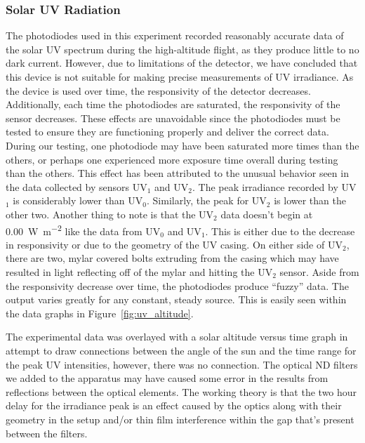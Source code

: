 





\subsubsection{Solar UV Radiation}

The photodiodes used in this experiment recorded reasonably accurate data of the solar UV spectrum during the high-altitude flight, as they produce little to no dark current. However, due to limitations of the detector, we have concluded that this device is not suitable for making precise measurements of UV irradiance. As the device is used over time, the responsivity of the detector decreases. Additionally, each time the photodiodes are saturated, the responsivity of the sensor decreases. These effects are unavoidable since the photodiodes must be tested to ensure they are functioning properly and deliver the correct data. During our testing, one photodiode may have been saturated more times than the others, or perhaps one experienced more exposure time overall during testing than the others. This effect has been attributed to the unusual behavior seen in the data collected by sensors UV$_1$ and UV$_2$. The peak irradiance recorded by UV$_1$ is considerably lower than UV$_0$. Similarly, the peak for UV$_2$ is lower than the other two. Another thing to note is that the UV$_2$ data doesn't begin at \SI{0.00}{\watt\per\meter\squared} like the data from UV$_0$ and UV$_1$. This is either due to the decrease in responsivity or due to the geometry of the UV casing. On either side of UV$_2$, there are two, mylar covered bolts extruding from the casing which may have resulted in light reflecting off of the mylar and hitting the UV$_2$ sensor. Aside from the responsivity decrease over time, the photodiodes produce ``fuzzy'' data. The output varies greatly for any constant, steady source. This is easily seen within the data graphs in Figure~\ref{fig:uv_altitude}.

The experimental data was overlayed with a solar altitude versus time graph in attempt to draw connections between the angle of the sun and the time range for the peak UV intensities, however, there was no connection. The optical ND filters we added to the apparatus may have caused some error in the results from reflections between the optical elements. The working theory is that the two hour delay for the irradiance peak is an effect caused by the optics along with their geometry in the setup and/or thin film interference within the gap that's present between the filters. 
